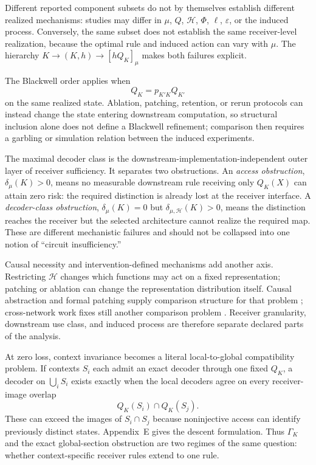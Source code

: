 Different reported component subsets do not by themselves establish different realized mechanisms: studies may differ in $\mu$, $Q$, $\mathscr H$, $\Phi$, $\ell$, $\varepsilon$, or the induced process. Conversely, the same subset does not establish the same receiver-level realization, because the optimal rule and induced action can vary with $\mu$. The hierarchy $K\to(K,h)\to[hQ_K]_\mu$ makes both failures explicit.

The Blackwell order applies when
\[
Q_K=p_{K'K}Q_{K'}
\]
on the same realized state. Ablation, patching, retention, or rerun protocols can instead change the state entering downstream computation, so structural inclusion alone does not define a Blackwell refinement; comparison then requires a garbling or simulation relation between the induced experiments.

The maximal decoder class is the downstream-implementation-independent outer layer of receiver sufficiency. It separates two obstructions. An \emph{access obstruction}, $\delta_\mu(K)>0$, means no measurable downstream rule receiving only $Q_K(X)$ can attain zero risk: the required distinction is already lost at the receiver interface. A \emph{decoder-class obstruction}, $\delta_\mu(K)=0$ but $\delta_{\mu,\mathscr H}(K)>0$, means the distinction reaches the receiver but the selected architecture cannot realize the required map. These are different mechanistic failures and should not be collapsed into one notion of ``circuit insufficiency.''

Causal necessity and intervention-defined mechanisms add another axis. Restricting $\mathscr H$ changes which functions may act on a fixed representation; patching or ablation can change the representation distribution itself. Causal abstraction and formal patching supply comparison structure for that problem \citep{geiger2025causal,hadad2026formal}; cross-network work fixes still another comparison problem \citep{sun2026equivalent}. Receiver granularity, downstream use class, and induced process are therefore separate declared parts of the analysis.

At zero loss, context invariance becomes a literal local-to-global compatibility problem. If contexts $S_i$ each admit an exact decoder through one fixed $Q_K$, a decoder on $\bigcup_i S_i$ exists exactly when the local decoders agree on every receiver-image overlap
\[
Q_K(S_i)\cap Q_K(S_j).
\]
These can exceed the images of $S_i\cap S_j$ because noninjective access can identify previously distinct states. Appendix~E gives the descent formulation. Thus $\Gamma_K$ and the exact global-section obstruction are two regimes of the same question: whether context-specific receiver rules extend to one rule.

